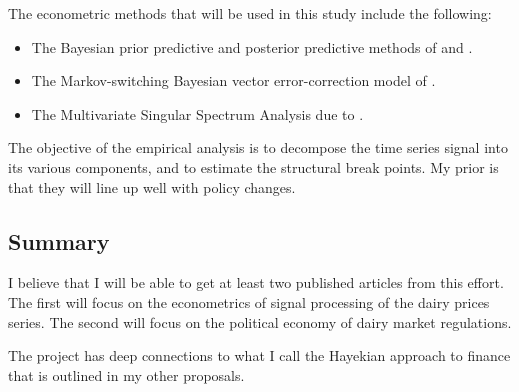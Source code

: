 \documentclass[11pt,]{article}
\def\tightlist{}
\begin{document}
The econometric methods that will be used in this study include the
following:

\begin{itemize}
\tightlist
\item
  The Bayesian prior predictive and posterior predictive methods of
  \citet{GewekeBook2} and \citet{LancasterBook}.
\item
  The Markov-switching Bayesian vector error-correction model of
  \citet{JochmannKoop2015}.
\item
  The Multivariate Singular Spectrum Analysis due to
  \citet{HassaniThomakos2010}.
\end{itemize}

The objective of the empirical analysis is to decompose the time series
signal into its various components, and to estimate the structural break
points. My prior is that they will line up well with policy changes.

\subsection{Summary}\label{summary}

I believe that I will be able to get at least two published articles
from this effort. The first will focus on the econometrics of signal
processing of the dairy prices series. The second will focus on the
political economy of dairy market regulations.

The project has deep connections to what I call the Hayekian approach to
finance that is outlined in my other proposals.

\newpage
\singlespacing 

\end{document}
